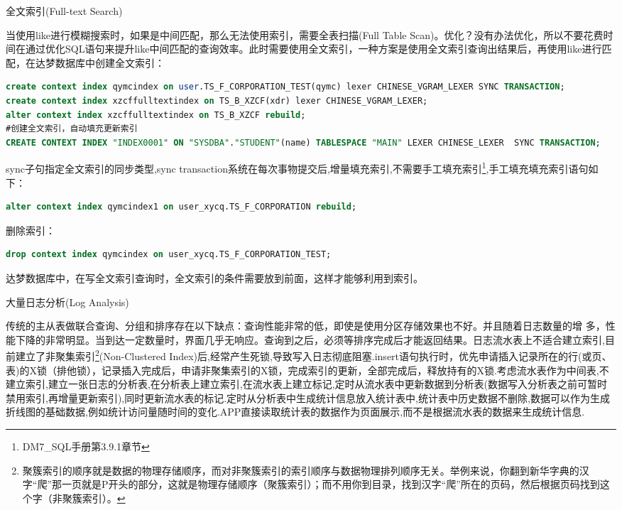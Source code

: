 \documentclass[12pt]{book}
\makeatletter
\numberwithin{dummy}{section}
\theoremstyle{ocrenumbox}
\theoremstyle{blacknumex}
\theoremstyle{blacknumbox}
\theoremstyle{ocrenum}
\renewcommand{\subsection}{\@startsection {subsection}{2}{\z@}
	{-3ex \@plus -0.1ex \@minus -.4ex}
	{0.5ex \@plus.2ex }
	{\normalfont\sffamily\bfseries}}
\renewcommand\paragraph{\@startsection{paragraph}{4}{\z@}
	{-2ex \@plus-.2ex \@minus .2ex}
	{.1ex}
	{\normalfont\small\sffamily\bfseries}}
\makeatother
\begin{document}
\paragraph{全文索引(Full-text Search)}

当使用like进行模糊搜索时，如果是中间匹配，那么无法使用索引，需要全表扫描(Full Table Scan)。优化？没有办法优化，所以不要花费时间在通过优化SQL语句来提升like中间匹配的查询效率。此时需要使用全文索引，一种方案是使用全文索引查询出结果后，再使用like进行匹配，在达梦数据库中创建全文索引：

\begin{lstlisting}[language=SQL]
create context index qymcindex on user.TS_F_CORPORATION_TEST(qymc) lexer CHINESE_VGRAM_LEXER SYNC TRANSACTION;
create context index xzcffulltextindex on TS_B_XZCF(xdr) lexer CHINESE_VGRAM_LEXER;
alter context index xzcffulltextindex on TS_B_XZCF rebuild;
#创建全文索引，自动填充更新索引
CREATE CONTEXT INDEX "INDEX0001" ON "SYSDBA"."STUDENT"(name) TABLESPACE "MAIN" LEXER CHINESE_LEXER  SYNC TRANSACTION;
\end{lstlisting}

sync子句指定全文索引的同步类型,sync transaction系统在每次事物提交后,增量填充索引,不需要手工填充索引\footnote{DM7\_SQL手册第3.9.1章节},手工填充填充索引语句如下：

\begin{lstlisting}[language=SQL]
alter context index qymcindex1 on user_xycq.TS_F_CORPORATION rebuild;
\end{lstlisting}

删除索引：

\begin{lstlisting}[language=SQL]
drop context index qymcindex on user_xycq.TS_F_CORPORATION_TEST;
\end{lstlisting}

达梦数据库中，在写全文索引查询时，全文索引的条件需要放到前面，这样才能够利用到索引。

\subsection{大量日志分析(Log Analysis)}

传统的主从表做联合查询、分组和排序存在以下缺点：查询性能非常的低，即使是使用分区存储效果也不好。并且随着日志数量的增 多，性能下降的非常明显。当到达一定数量时，界面几乎无响应。查询到之后，必须等排序完成后才能返回结果。日志流水表上不适合建立索引,目前建立了非聚集索引\footnote{聚簇索引的顺序就是数据的物理存储顺序，而对非聚簇索引的索引顺序与数据物理排列顺序无关。举例来说，你翻到新华字典的汉字“爬”那一页就是P开头的部分，这就是物理存储顺序（聚簇索引）；而不用你到目录，找到汉字“爬”所在的页码，然后根据页码找到这个字（非聚簇索引）。}(Non-Clustered Index)后,经常产生死锁,导致写入日志彻底阻塞.insert语句执行时，优先申请插入记录所在的行(或页、表)的X锁（排他锁），记录插入完成后，申请非聚集索引的X锁，完成索引的更新，全部完成后，释放持有的X锁.考虑流水表作为中间表,不建立索引,建立一张日志的分析表,在分析表上建立索引,在流水表上建立标记,定时从流水表中更新数据到分析表(数据写入分析表之前可暂时禁用索引,再增量更新索引),同时更新流水表的标记.定时从分析表中生成统计信息放入统计表中,统计表中历史数据不删除,数据可以作为生成折线图的基础数据,例如统计访问量随时间的变化.APP直接读取统计表的数据作为页面展示,而不是根据流水表的数据来生成统计信息.
\end{document}
